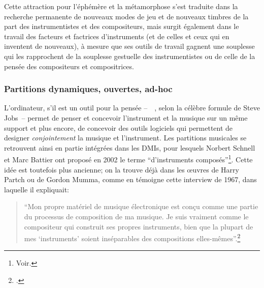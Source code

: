 \noindent Cette attraction pour l'éphémère et la métamorphose s'est traduite dans la recherche permanente de nouveaux modes de jeu et de nouveaux timbres de la part des instrumentistes et des compositeurs, mais surgit également dans le travail des facteurs et factrices d'instruments (et de celles et ceux qui en inventent de nouveaux), à mesure que ses outils de travail gagnent une souplesse qui les rapprochent de la souplesse gestuelle des instrumentistes ou de celle de la pensée des compositeurs et compositrices.



\subsubsection{Partitions dynamiques, ouvertes, ad-hoc}
\label{sec:ephemeral:longevity_stability:dynamic_scores}


\noindent L'ordinateur, s'il est un outil pour la pensée --~~, selon la célèbre formule de Steve Jobs~-- permet de penser et concevoir l'instrument et la musique sur un même support et plus encore, de concevoir des outils logiciels qui permettent de designer \textit{conjointement} la musique et l'instrument. Les partitions musicales se retrouvent ainsi en partie intégrées dans les \glspl{DMI}, pour lesquels Norbert Schnell et Marc Battier ont proposé en 2002 le terme ``d'instruments composés''\footnote{Voir\cite{schnell_introducing_2002}.}. Cette idée est toutefois plus ancienne; on la trouve déjà dans les œuvres de Harry Partch ou de Gordon Mumma, comme en témoigne cette interview de 1967, dans laquelle il expliquait: 
\blockquote{``Mon propre matériel de musique électronique est conçu comme une partie du processus de composition de ma musique. Je suis vraiment comme le compositeur qui construit ses propres instruments, bien que la plupart de mes `instruments' soient inséparables des compositions elles-mêmes''.\footnote{ \cite{mumma_creative_1967}.}} 

